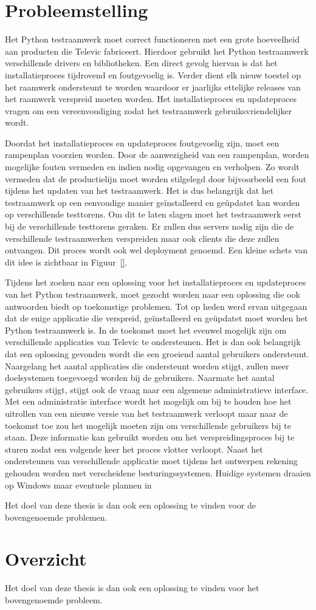 
\section{Probleemstelling}\label{sec:probleem}
Het Python testraamwerk moet correct functioneren met een grote hoeveelheid aan producten die Televic fabriceert.
Hierdoor gebruikt het Python testraamwerk verschillende drivers en bibliotheken.
Een direct gevolg hiervan is dat het installatieproces tijdrovend en foutgevoelig is.
Verder dient elk nieuw toestel op het raamwerk ondersteunt te worden waardoor er jaarlijks ettelijke releases van het raamwerk verspreid moeten worden.
Het installatieproces en updateproces vragen om een vereenvoudiging zodat het testraamwerk gebruiksvriendelijker wordt.

Doordat het installatieproces en updateproces foutgevoelig zijn, moet een rampenplan voorzien worden.
Door de aanwezigheid van een rampenplan, worden mogelijke fouten vermeden en indien nodig opgevangen en verholpen.
Zo wordt vermeden dat de productielijn moet worden stilgelegd door bijvoorbeeld een fout tijdens het updaten van het testraamwerk.
Het is dus belangrijk dat het testraamwerk op een eenvoudige manier geïnstalleerd en geüpdatet kan worden op verschillende testtorens.
Om dit te laten slagen moet het testraamwerk eerst bij de verschillende testtorens geraken.
Er zullen dus servers nodig zijn die de verschillende testraamwerken verspreiden maar ook clients die deze zullen ontvangen.
Dit proces wordt ook wel deployment genoemd.
Een kleine schets van dit idee is zichtbaar in Figuur~\vref{}.%


Tijdens het zoeken naar een oplossing voor het installatieproces en updateproces van het Python testraamwerk, moet gezocht worden naar een oplossing die ook antwoorden biedt op toekomstige problemen.
Tot op heden werd ervan uitgegaan dat de enige applicatie die verspreid, geïnstalleerd en geüpdatet moet worden het Python testraamwerk is.
In de toekomst moet het evenwel mogelijk zijn om verschillende applicaties van Televic te ondersteunen.
Het is dan ook belangrijk dat een oplossing gevonden wordt die een groeiend aantal gebruikers ondersteunt.
Naargelang het aantal applicaties die ondersteunt worden stijgt, zullen meer doelsystemen toegevoegd worden bij de gebruikers.
Naarmate het aantal gebruikers stijgt, stijgt ook de vraag naar een algemene administratieve interface.
Met een administratie interface wordt het mogelijk om bij te houden hoe het uitrollen van een nieuwe versie van het testraamwerk verloopt maar naar de toekomst toe zou het mogelijk moeten zijn om verschillende gebruikers bij te staan.
Deze informatie kan gebruikt worden om het verspreidingsproces bij te sturen zodat een volgende keer het proces vlotter verloopt.
Naast het ondersteunen van verschillende applicatie moet tijdens het ontwerpen rekening gehouden worden met verscheidene besturingssystemen.
Huidige systemen draaien op Windows maar eventuele plannen in %

Het doel van deze thesis is dan ook een oplossing te vinden voor de bovengenoemde problemen.


\section{Overzicht}
Het doel van deze thesis is dan ook een oplossing te vinden voor het bovengenoemde probleem.